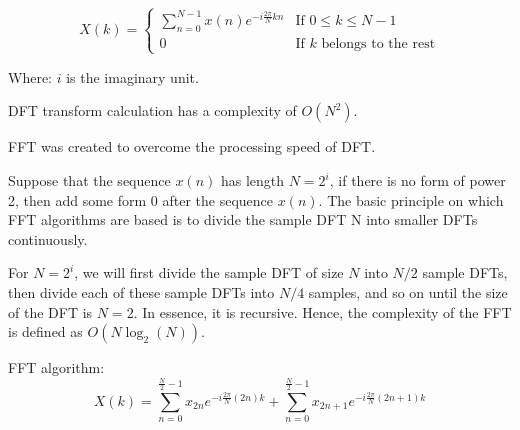 \documentclass{ieeeojies}
\begin{document}
\[
X(k) = 
\begin{cases} 
\sum_{n=0}^{N-1} x(n) e^{-i \frac{2\pi}{N} kn} & \text{If } 0 \le k \le N-1 \\
0 & \text{If } k \text{ belongs to the rest}
\end{cases}
\]

Where: \( i \) is the imaginary unit.

DFT transform calculation has a complexity of \(O(N^2)\).

FFT was created to overcome the processing speed of DFT. 

Suppose that the sequence \(x(n)\) has length \( N = 2^i \), if there is no form of power 2, then add some form 0 after the sequence \(x(n)\). The basic principle on which FFT algorithms are based is to divide the sample DFT N into smaller DFTs continuously. 

For \( N = 2^i \), we will first divide the sample DFT of size \( N \) into \( N/2 \) sample DFTs, then divide each of these sample DFTs into \( N/4 \) samples, and so on until the size of the DFT is \( N = 2 \). In essence, it is recursive. Hence, the complexity of the FFT is defined as \( O(N \log_2(N)) \).

FFT algorithm: 
\[
X(k) = \sum_{n=0}^{\frac{N}{2}-1} x_{2n} e^{-i \frac{2\pi}{N} (2n) k} + \sum_{n=0}^{\frac{N}{2}-1} x_{2n+1} e^{-i \frac{2\pi}{N} (2n+1) k}
\]
    
\end{document}
